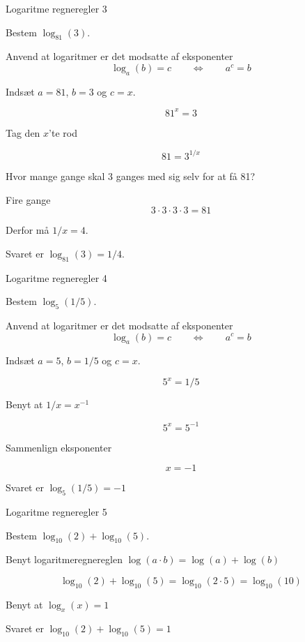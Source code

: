 \documentclass{article}
\begin{document}
\newpage
\begin{exercise}{Logaritme regneregler 3}
	
	Bestem $\log_{81}(3)$.
	
	
	\hint
	
	Anvend at logaritmer er det modsatte af eksponenter
	\[
	\log_a(b) = c \qquad \Leftrightarrow \qquad a^c = b
	\]
	
	\hint
	
	Indsæt $a=81$, $b=3$ og $c=x$.
	
	\hint
	\[
	81^x = 3
	\]
	
	\hint
	Tag den $x$'te rod
	
	\hint
	\[
	81 = 3^{1/x}
	\]
	
	\hint
	Hvor mange gange skal 3 ganges med sig selv for at få 81?
	
	\hint
	Fire gange
	\[
	3 \cdot 3 \cdot 3 \cdot 3 = 81
	\]
	
	\hint
	Derfor må $1/x = 4$.
	
	\hint
	Svaret er $\log_{81}(3) = 1/4$.
	
\end{exercise}

\newpage
\begin{exercise}{Logaritme regneregler 4}
	
	Bestem $\log_{5}(1/5)$.
	
	
	\hint
	
	Anvend at logaritmer er det modsatte af eksponenter
	\[
	\log_a(b) = c \qquad \Leftrightarrow \qquad a^c = b
	\]
	
	\hint
	
	Indsæt $a=5$, $b=1/5$ og $c=x$.
	
	\hint
	\[
	5^x = 1/5
	\]
	
	\hint 
	
	Benyt at $1/x = x^{-1}$

	\hint
	\[
	5^x = 5^{-1}
	\]

	\hint
	
	Sammenlign eksponenter
	
	\hint 
	\[
	x = -1
	\]
	
	\hint
	Svaret er $\log_{5}(1/5) = -1$
	
	
\end{exercise}

\newpage
\begin{exercise}{Logaritme regneregler 5}
	
	Bestem $\log_{10}(2) + \log_{10}(5)$.
	
	
	\hint
	
	Benyt logaritmeregnereglen $\log(a \cdot b) =  \log(a) + \log(b)$

	\hint
	\[
	\log_{10}(2) + \log_{10}(5) = \log_{10}(2 \cdot 5) = \log_{10}(10)
	\]
	
	\hint 
	Benyt at $\log_{x}(x) = 1$
	
	\hint
	
	Svaret er $\log_{10}(2) + \log_{10}(5) = 1$
\end{exercise}
\end{document}
